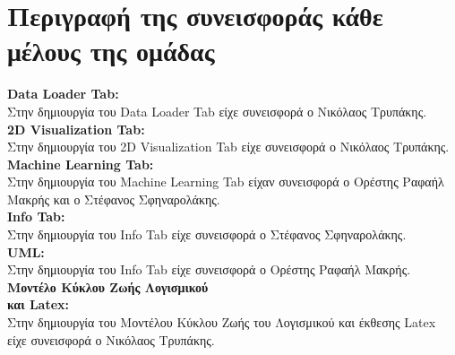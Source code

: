 \documentclass{article}
\begin{document}
{{{{{{\newpage
\section{Περιγραφή της συνεισφοράς κάθε μέλους της ομάδας}
\vspace{0.3 cm}
\fontsize{14pt}{14pt}\selectfont
\textbf{Data Loader Tab:}\\
Στην δημιουργία του Data Loader Tab είχε συνεισφορά ο Νικόλαος Τρυπάκης.\\ \vspace{0.3 cm}
\textbf{2D Visualization Tab:}\\
Στην δημιουργία του 2D Visualization Tab είχε συνεισφορά ο Νικόλαος Τρυπάκης.\\ \vspace{0.3 cm}
\textbf{Machine Learning Tab:}\\
Στην δημιουργία του Machine Learning Tab είχαν συνεισφορά ο Ορέστης Ραφαήλ Μακρής και ο Στέφανος Σφηναρολάκης.\\ \vspace{0.3 cm}
\textbf{Info Tab:}\\
Στην δημιουργία του Info Tab είχε συνεισφορά ο Στέφανος Σφηναρολάκης.\\ \vspace{0.3 cm}
\textbf{UML:}\\
Στην δημιουργία του Info Tab είχε συνεισφορά ο Ορέστης Ραφαήλ Μακρής.\\ \vspace{0.3 cm}
\textbf{Μοντέλο Κύκλου Ζωής Λογισμικού \\και Latex:}\\
Στην δημιουργία του Μοντέλου Κύκλου Ζωής του Λογισμικού και έκθεσης Latex είχε συνεισφορά ο Νικόλαος Τρυπάκης.\\ \vspace{0.3 cm}

\newpage
}}}}}}
\end{document}
